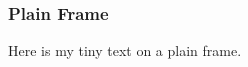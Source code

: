 \begin{frame}[plain]
    \frametitle{Plain Frame}
    \begin{center}
        Here is my tiny text on a plain frame.
    \end{center}
\end{frame}
